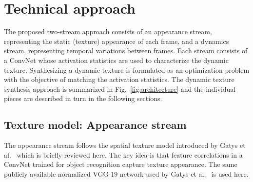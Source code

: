 \chapter{Technical approach }

The proposed two-stream approach consists of an appearance
stream, representing the static (texture) appearance of each frame,
and a dynamics stream, representing temporal 
variations between frames.
Each stream consists of a ConvNet whose activation 
statistics are used to characterize the dynamic texture.
Synthesizing a dynamic texture is formulated as an optimization 
problem with the objective of matching the activation 
statistics.
The dynamic texture synthesis approach is summarized in Fig.\ \ref{fig:architecture}
and the individual pieces are described in turn in the
following sections.



\section{Texture model: Appearance stream}

The appearance stream follows the spatial texture model
introduced by Gatys et al.\ \cite{gatys2015} which is
briefly reviewed here.
The key idea is that feature correlations in a 
ConvNet trained for 
object recognition  
capture texture appearance.
The same publicly available normalized VGG-19 network \cite{simonyan2014very} used by Gatys et al.\ \cite{gatys2015} is used here.

